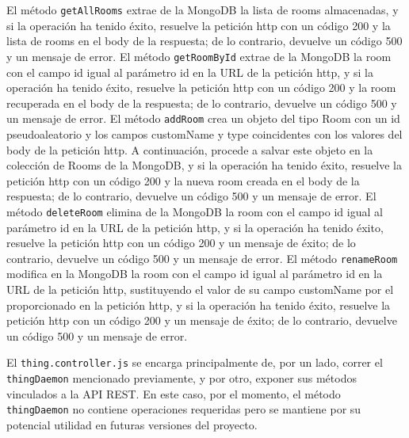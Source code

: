 \vspace{0.5cm}

El método \verb|getAllRooms| extrae de la MongoDB la lista de rooms almacenadas, y si la operación ha tenido éxito, resuelve la petición http con un código 200 y la lista de rooms en el body de la respuesta; de lo contrario, devuelve un código 500 y un mensaje de error.
El método \verb|getRoomById| extrae de la MongoDB la room con el campo id igual al parámetro id en la URL de la petición http, y si la operación ha tenido éxito, resuelve la petición http con un código 200 y la room recuperada en el body de la respuesta; de lo contrario, devuelve un código 500 y un mensaje de error.
El método \verb|addRoom| crea un objeto del tipo Room con un id pseudoaleatorio y los campos customName y type coincidentes con los valores del body de la petición http. A continuación, procede a salvar este objeto en la colección de Rooms de la MongoDB, y si la operación ha tenido éxito, resuelve la petición http con un código 200 y la nueva room creada en el body de la respuesta; de lo contrario, devuelve un código 500 y un mensaje de error.
El método \verb|deleteRoom| elimina de la MongoDB la room con el campo id igual al parámetro id en la URL de la petición http, y si la operación ha tenido éxito, resuelve la petición http con un código 200 y un mensaje de éxito; de lo contrario, devuelve un código 500 y un mensaje de error.
El método \verb|renameRoom| modifica en la MongoDB la room con el campo id igual al parámetro id en la URL de la petición http, sustituyendo el valor de su campo customName por el proporcionado en la petición http, y si la operación ha tenido éxito, resuelve la petición http con un código 200 y un mensaje de éxito; de lo contrario, devuelve un código 500 y un mensaje de error.

\vspace{1cm}

El \verb|thing.controller.js| se encarga principalmente de, por un lado, correr el \verb|thingDaemon| mencionado previamente, y por otro, exponer sus métodos vinculados a la API REST.
En este caso, por el momento, el método \verb|thingDaemon| no contiene operaciones requeridas pero se mantiene por su potencial utilidad en futuras versiones del proyecto.

\vspace{0.5cm}

